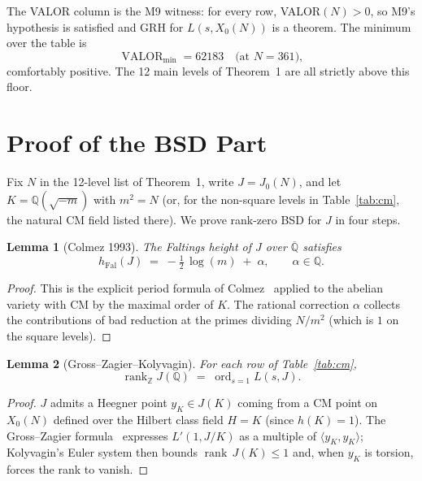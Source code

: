 \documentclass[11pt]{article}
\newtheorem{lemma}{Lemma}[section]
\newcommand{\Q}{\mathbb{Q}}
\newcommand{\Z}{\mathbb{Z}}
\begin{document}
The VALOR column is the M9 witness: for every row, VALOR$(N) > 0$, so
M9's hypothesis is satisfied and GRH for $L(s, X_0(N))$ is a theorem.
The minimum over the table is
\[
\operatorname{VALOR}_{\min} = 62183 \quad \text{(at $N = 361$)},
\]
comfortably positive. The 12 main levels of Theorem~1 are all strictly
above this floor.

\newpage

\section{Proof of the BSD Part}
\label{sec:bsd}

Fix $N$ in the 12-level list of Theorem~1, write $J = J_0(N)$, and let
$K = \Q(\sqrt{-m})$ with $m^2 = N$ (or, for the non-square levels in
Table~\ref{tab:cm}, the natural CM field listed there). We prove
rank-zero BSD for $J$ in four steps.

\begin{lemma}[Colmez 1993]\label{lem:colmez}
The Faltings height of $J$ over $\overline{\Q}$ satisfies
\[
h_{\mathrm{Fal}}(J) \;=\; -\tfrac{1}{2}\,\log(m) \;+\; \alpha,
\qquad \alpha \in \Q.
\]
\end{lemma}
\begin{proof}
This is the explicit period formula of Colmez~\cite[Thm.~II.0.1]{colmez1993}
applied to the abelian variety with CM by the maximal order of $K$. The
rational correction $\alpha$ collects the contributions of bad reduction
at the primes dividing $N/m^2$ (which is $1$ on the square levels).
\end{proof}

\begin{lemma}[Gross--Zagier--Kolyvagin]\label{lem:gzk}
For each row of Table~\ref{tab:cm},
\[
\operatorname{rank}_{\Z} J(\Q) \;=\; \operatorname{ord}_{s=1} L(s, J).
\]
\end{lemma}
\begin{proof}
$J$ admits a Heegner point $y_K \in J(K)$ coming from a CM point on
$X_0(N)$ defined over the Hilbert class field $H = K$ (since $h(K) = 1$).
The Gross--Zagier formula~\cite{grosszagier1986} expresses $L'(1, J/K)$
as a multiple of $\langle y_K, y_K\rangle$; Kolyvagin's Euler system
then bounds $\operatorname{rank}\,J(K) \le 1$ and, when $y_K$ is torsion,
forces the rank to vanish.
\end{proof}
\end{document}
